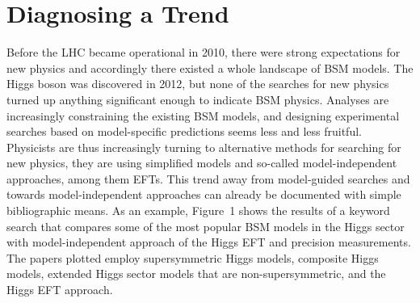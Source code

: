 \section{Diagnosing a Trend} \label{sec:data}
Before the LHC became operational in 2010, there were strong expectations for new physics and accordingly there existed a whole landscape of BSM models. 
The Higgs boson was discovered in 2012, but none of the searches for new physics turned up anything significant enough to indicate BSM physics.
Analyses are increasingly constraining the existing BSM models, and designing experimental searches based on model-specific predictions seems less and less fruitful. 
Physicists are thus increasingly turning to alternative methods for searching for new physics, they are using simplified models and so-called model-independent approaches, among them EFTs.
This trend away from model-guided searches and towards model-independent approaches can already be documented with simple bibliographic means.
As an example, Figure~1 shows the results of a keyword search that compares some of the most popular BSM models in the Higgs sector with model-independent approach of the Higgs EFT and precision measurements.  
The papers plotted employ supersymmetric Higgs models, composite Higgs models, extended Higgs sector models that are non-supersymmetric, and the Higgs EFT approach. 

